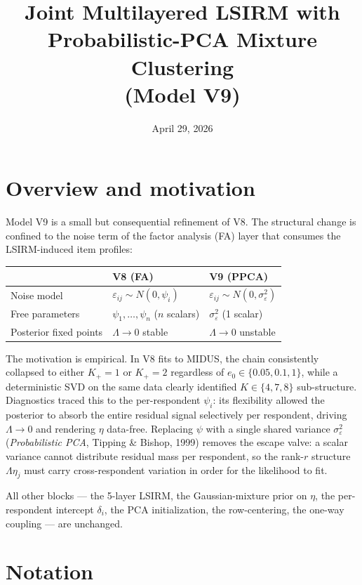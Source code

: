 \documentclass[11pt]{article}
\title{Joint Multilayered LSIRM with Probabilistic-PCA Mixture Clustering\\
(Model V9)}
\date{April 29, 2026}
\begin{document}
\maketitle

\section{Overview and motivation}

Model V9 is a small but consequential refinement of V8.
The structural change is confined to the noise term of the factor analysis
(FA) layer that consumes the LSIRM-induced item profiles:

\begin{center}
\begin{tabular}{lll}
\toprule
& V8 (FA) & V9 (PPCA) \\
\midrule
Noise model & $\varepsilon_{ij}\sim N(0,\psi_i)$ &
              $\varepsilon_{ij}\sim N(0,\sigma_\varepsilon^2)$ \\
Free parameters & $\psi_1,\dots,\psi_n$ ($n$ scalars) & $\sigma_\varepsilon^2$ (1 scalar) \\
Posterior fixed points & $\Lambda{\to}0$ stable & $\Lambda{\to}0$ unstable \\
\bottomrule
\end{tabular}
\end{center}

The motivation is empirical. In V8 fits to MIDUS, the chain consistently
collapsed to either $K_+=1$ or $K_+=2$ regardless of $e_0\in\{0.05,0.1,1\}$,
while a deterministic SVD on the same data clearly identified $K\in\{4,7,8\}$
sub-structure. Diagnostics traced this to the per-respondent $\psi_i$:
its flexibility allowed the posterior to absorb the entire residual signal
selectively per respondent, driving $\Lambda{\to}0$ and rendering
$\eta$ data-free.
Replacing $\psi$ with a single shared variance $\sigma_\varepsilon^2$
(\emph{Probabilistic PCA}, Tipping \& Bishop, 1999) removes the escape
valve: a scalar variance cannot distribute residual mass per respondent,
so the rank-$r$ structure $\Lambda\eta_j$ must carry cross-respondent
variation in order for the likelihood to fit.

All other blocks --- the 5-layer LSIRM, the Gaussian-mixture prior on $\eta$,
the per-respondent intercept $\delta_i$, the PCA initialization,
the row-centering, the one-way coupling --- are unchanged.

\section{Notation}
\end{document}
